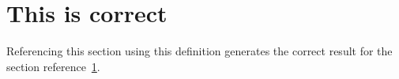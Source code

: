 \documentclass{article}
\begin{document}
  \section{This is correct}\label{sec:OK}
  Referencing this section using this definition generates
  the correct result for the section reference~\ref{sec:OK}.
\end{document}
